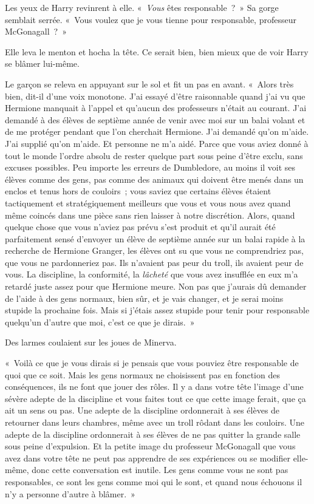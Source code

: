Les yeux de Harry revinrent à elle. «~\emph{Vous} êtes responsable~?~» Sa gorge semblait serrée. «~Vous voulez que je vous tienne pour responsable, professeur McGonagall~?~»

Elle leva le menton et hocha la tête. Ce serait bien, bien mieux que de voir Harry se blâmer lui-même.

Le garçon se releva en appuyant sur le sol et fit un pas en avant. «~Alors très bien, dit-il d'une voix monotone. J'ai essayé d'être raisonnable quand j'ai vu que Hermione manquait à l'appel et qu'aucun des professeurs n'était au courant. J'ai demandé à des élèves de septième année de venir avec moi sur un balai volant et de me protéger pendant que l'on cherchait Hermione. J'ai demandé qu'on m'aide. J'ai supplié qu'on m'aide. Et personne ne m'a aidé. Parce que vous aviez donné à tout le monde l'ordre absolu de rester quelque part sous peine d'être exclu, sans excuses possibles. Peu importe les erreurs de Dumbledore, au moins il voit ses élèves comme des gens, pas comme des animaux qui doivent être menés dans un enclos et tenus hors de couloirs~; vous saviez que certains élèves étaient tactiquement et stratégiquement meilleurs que vous et vous nous avez quand même coincés dans une pièce sans rien laisser à notre discrétion. Alors, quand quelque chose que vous n'aviez pas prévu s'est produit et qu'il aurait été parfaitement sensé d'envoyer un élève de septième année sur un balai rapide à la recherche de Hermione Granger, les élèves ont su que vous ne comprendriez pas, que vous ne pardonneriez pas. Ils n'avaient pas peur du troll, ils avaient peur de vous. La discipline, la conformité, la \emph{lâcheté} que vous avez insufflée en eux m'a retardé juste assez pour que Hermione meure. Non pas que j'aurais dû demander de l'aide à des gens normaux, bien sûr, et je vais changer, et je serai moins stupide la prochaine fois. Mais si j'étais assez stupide pour tenir pour responsable quelqu'un d'autre que moi, c'est ce que je dirais.~»

Des larmes coulaient sur les joues de Minerva.

«~Voilà ce que je vous dirais si je pensais que vous pouviez être responsable de quoi que ce soit. Mais les gens normaux ne choisissent pas en fonction des conséquences, ils ne font que jouer des rôles. Il y a dans votre tête l'image d'une sévère adepte de la discipline et vous faites tout ce que cette image ferait, que ça ait un sens ou pas. Une adepte de la discipline ordonnerait à ses élèves de retourner dans leurs chambres, même avec un troll rôdant dans les couloirs. Une adepte de la discipline ordonnerait à ses élèves de ne pas quitter la grande salle sous peine d'expulsion. Et la petite image du professeur McGonagall que vous avez dans votre tête ne peut pas apprendre de ses expériences ou se modifier elle-même, donc cette conversation est inutile. Les gens comme vous ne sont pas responsables, ce sont les gens comme moi qui le sont, et quand nous échouons il n'y a personne d'autre à blâmer.~»

